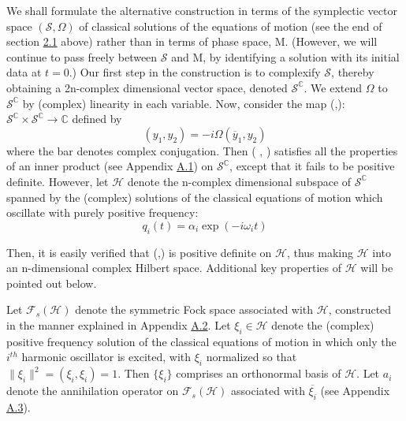 \documentclass[11pt,a4paper]{article}
\begin{document}
We shall formulate the alternative construction in terms of the symplectic vector space \((\mathcal{S}, \Omega)\) of classical solutions of the equations of motion (see the end of section \hyperlink{sec:2.1}{2.1} above) rather than in terms of phase space, M. (However, we will continue to pass freely between \(\mathcal{S}\) and M, by identifying a solution with its initial data at \(t=0\).) Our first step in the construction is to complexify \(\mathcal{S}\), thereby obtaining a 2n-complex dimensional vector space, denoted \(\mathcal{S}^{\mathbb C}\). We extend \(\Omega\) to \(\mathcal{S}^{\mathbb{C}}\) by (complex) linearity in each variable. Now, consider the map (,): \(\mathcal{S}^{\mathbb{C}} \times \mathcal{S}^{\mathbb{C}} \to \mathbb{C}\) defined by
\begin{equation*}
(y_1, y_2) = -i\Omega(\overline{y}_1, y_2) \tag{2.3.16}\label{eq:2.3.16}
\end{equation*}
where the bar denotes complex conjugation. Then ( , ) satisfies all the properties of an inner product (see Appendix \hyperlink{sec:A.1}{A.1}) on \(\mathcal{S}^{\mathbb C}\), except \hypertarget{source-38}{} that it fails to be positive definite. However, let \(\mathcal{H}\) denote the n-complex dimensional subspace of \(\mathcal{S}^{\mathbb{C}}\) spanned by the (complex) solutions of the classical equations of motion which oscillate with purely positive frequency:
\begin{equation*}
q_i(t) = \alpha_i \exp(-i\omega_i t) \tag{2.3.17}\label{eq:2.3.17}
\end{equation*}

Then, it is easily verified that (,) is positive definite on \(\mathcal{H}\), thus making \(\mathcal{H}\) into an n-dimensional complex Hilbert space. Additional key properties of \(\mathcal{H}\) will be pointed out below.

Let \(\mathcal{F}_s(\mathcal{H})\) denote the symmetric Fock space associated with \(\mathcal{H}\), constructed in the manner explained in Appendix \hyperlink{sec:A.2}{A.2}. Let \(\xi_i\in\mathcal{H}\) denote the (complex) positive frequency solution of the classical equations of motion in which only the \(i^{th}\) harmonic oscillator is excited, with \(\xi_i\) normalized so that \(\lVert\xi_i\rVert^2=(\xi_i, \xi_i)=1\). Then \(\{\xi_i\}\) comprises an orthonormal basis of \(\mathcal{H}\). Let \(a_i\) denote the annihilation operator on \(\mathcal{F}_s(\mathcal{H})\) associated with \(\overline{\xi_i}\) (see Appendix \hyperlink{sec:A.3}{A.3}).
\end{document}
